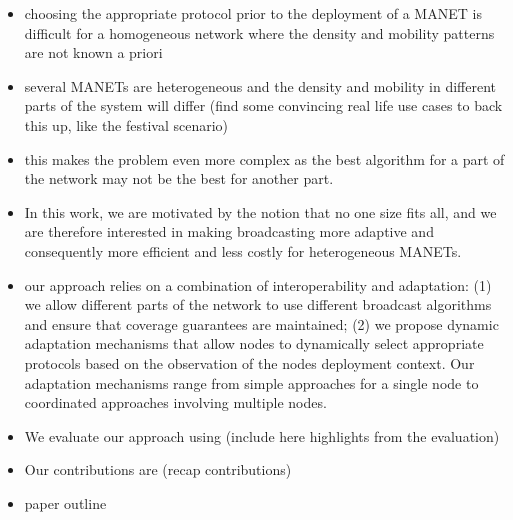 {\begin{itemize}
	\item choosing the appropriate protocol prior to the deployment of a MANET is difficult for a homogeneous network where the density and mobility patterns are not known a priori
	\item several MANETs are heterogeneous \cite{Camp2002,bai2004mobility,Ramdhany2008} %
	and the density and mobility in different parts of the system will differ (find some convincing real life use cases to back this up, like the festival scenario)
	\item this makes the problem even more complex as the best algorithm for a part of the network may not be the best for another part.
	\item In this work, we are motivated by the notion that no one size fits all, and we are therefore interested in making broadcasting more adaptive and consequently more efficient and less costly for heterogeneous MANETs.
	\item our approach relies on a combination of interoperability and adaptation: (1) we allow different parts of the network to use different broadcast algorithms and ensure that coverage guarantees are maintained; (2) we propose dynamic adaptation mechanisms that allow nodes to dynamically select appropriate protocols based on the observation of the nodes deployment context. Our adaptation mechanisms range from simple approaches for a single node to coordinated approaches involving multiple nodes.
	\item We evaluate our approach using (include here highlights from the evaluation)
	\item Our contributions are (recap contributions)
	\item paper outline
\end{itemize}
}
